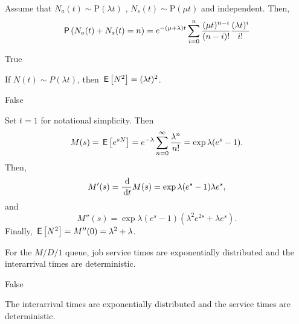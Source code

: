 \begin{exercise}[201703] Assume that
  $N_a(t)\sim \text{P}(\lambda t)$ , $N_s(t) \sim \text{P}(\mu t)$ and
  independent.   Then,
  \begin{equation*}
\P{N_a(t) + N_s(t) = n} 
= e^{-(\mu+\lambda)t} \sum_{i=0}^n \frac{(\mu t)^{n-i}}{(n-i)!} \frac{(\lambda t)^i}{i!}  \\
  \end{equation*}
  \begin{solution}
    True
  \end{solution}
\end{exercise}


\begin{exercise}[201703]
  If $N(t)\sim P(\lambda t)$,
 then $\,\mathsf{E}\left[N^2\right]=(\lambda t)^2$.

 \begin{solution}
False

Set $t=1$ for notational simplicity. Then
\begin{equation*}
   M(s) = \,\mathsf{E}\left[e^{sN}\right] = e^{-\lambda}\sum_{n=0}^\infty \frac{\lambda^n}{n!} = \exp{\lambda(e^s-1)}.
\end{equation*}
Then, 
\begin{equation*}
  M'(s) = \frac{\d}{\d t} M(s) = \exp{\lambda(e^s-1)}\lambda e^s,
\end{equation*}
and 
\begin{equation*}
  M''(s) = \exp{\lambda(e^s-1)}(\lambda^2 e^{2s} + \lambda e^s).
\end{equation*}
Finally, 
$\,\mathsf{E}\left[N^2\right] = M''(0) = \lambda^2+\lambda$. 

 \end{solution}
\end{exercise}


\begin{exercise}[201703]
  For the $M/D/1$ queue, job service times are exponentially
  distributed and the interarrival times are deterministic.

  \begin{solution}
    False

    The interarrival times are exponentially distributed and the
    service times are deterministic.
  \end{solution}
\end{exercise}

